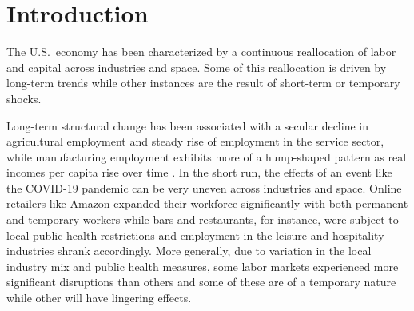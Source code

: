 \documentclass[onehalfspacing,11pt]{article}
\begin{document}
%
%
%
%
%


\section{Introduction}
The U.S.~economy has been characterized by a continuous reallocation of labor and capital across industries and space. Some of this reallocation is driven by long-term trends while other instances are the result of short-term or temporary shocks.

Long-term structural change has been associated with a secular decline in agricultural employment and steady rise of employment in the service sector, while manufacturing employment exhibits more of a hump-shaped pattern as real incomes per capita rise over time \citep{Herrendorf:2013b}. In the short run, the effects of an event like the COVID-19 pandemic can be very uneven across industries and space. Online retailers like Amazon expanded their workforce significantly with both permanent and temporary workers while bars and restaurants, for instance, were subject to local public health restrictions and employment in the leisure and hospitality industries shrank accordingly. More generally, due to variation in the local industry mix and public health measures, some labor markets experienced more significant disruptions than others and some of these are of a temporary nature while other will have lingering effects.
\end{document}
